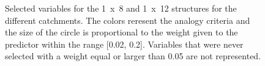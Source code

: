 \documentclass[draft]{agujournal2019}
\begin{document}
\begin{figure}[H]
	\vspace{-1cm}
	\noindent{}
	\vspace{-0.8cm}
	\caption{Selected variables for the 1~x~8 and 1~x~12 structures for the different catchments. The colors reresent the analogy criteria and the size of the circle is proportional to the weight given to the predictor within the range [0.02, 0.2]. Variables that were never selected with a weight equal or larger than 0.05 are not represented.}
	\label{fig_multiple_variables}
\end{figure}
\end{document}
